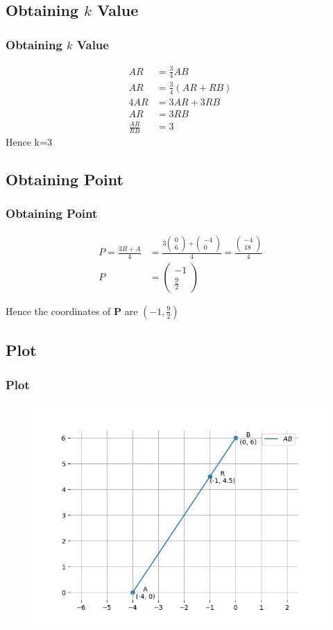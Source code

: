 \documentclass{beamer}
\providecommand{\brak}[1]{\ensuremath{\left(#1\right)}}
\theoremstyle{remark}
\newcommand{\myvec}[1]{\ensuremath{\begin{pmatrix}#1\end{pmatrix}}}
\let\vec\mathbf
\numberwithin{equation}{section}
\begin{document}
\subsection{Obtaining $k$ Value}
\begin{frame}
\frametitle{Obtaining $k$ Value}
\begin{align}
	AR&=\frac{3}{4}AB \\
    AR&=\frac{3}{4}(AR+RB) \\
    4AR&=3AR+3RB \\
    AR&=3RB\\
\frac{AR}{RB}&=3
\end{align}
Hence k=3
\end{frame}
\subsection{Obtaining Point}
\begin{frame}
\frametitle{Obtaining Point}

\begin{align}
P=\frac{3B+A}{4}&=\frac{3\myvec{0\\6}+\myvec{-4\\0}}{4}=\frac{\myvec{-4\\18}}{4} \\
P&=\myvec{-1\\\frac{9}{2}}
\end{align}

Hence the coordinates of $\vec{P}$ are $\brak{-1,\frac{9}{2}}$



\end{frame}

\subsection{Plot}
\begin{frame}[fragile]
\frametitle{Plot}

\begin{figure}[h!]
   \centering
   \includegraphics[width=0.7\columnwidth]{figs/fig1.png}
	\caption{}
   \label{stemplot}
\end{figure}
\end{frame}
\end{document}
